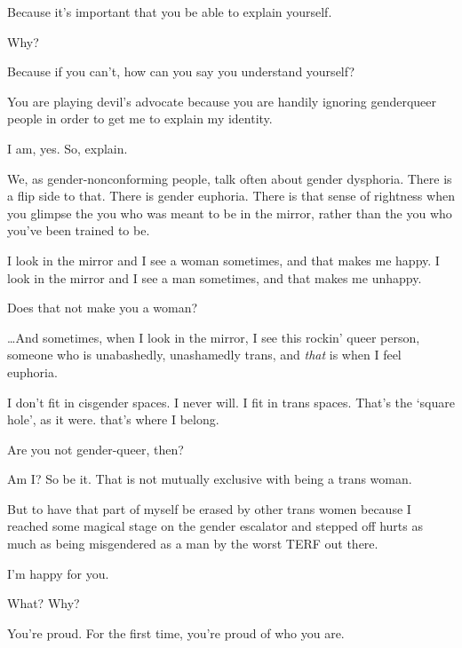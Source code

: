 \begin{ally}
Because it's important that you be able to explain yourself.
\end{ally}
Why?

\begin{ally}
Because if you can't, how can you say you understand yourself?
\end{ally}
\newpage

You are playing devil's advocate because you are handily ignoring genderqueer people in order to get me to explain my identity.

\begin{ally}
I am, yes. So, explain.
\end{ally}
We, as gender-nonconforming people, talk often about gender dysphoria. There is a flip side to that. There is gender euphoria. There is that sense of rightness when you glimpse the you who was meant to be in the mirror, rather than the you who you've been trained to be.

I look in the mirror and I see a woman sometimes, and that makes me happy. I look in the mirror and I see a man sometimes, and that makes me unhappy.

\begin{ally}
Does that not make you a woman?
\end{ally}
\ldots{}And sometimes, when I look in the mirror, I see this rockin' queer person, someone who is unabashedly, unashamedly trans, and \emph{that} is when I feel euphoria.

I don't fit in cisgender spaces. I never will. I fit in trans spaces. That's the `square hole', as it were. that's where I belong.

\begin{ally}
Are you not gender-queer, then?
\end{ally}
Am I? So be it. That is not mutually exclusive with being a trans woman.

But to have that part of myself be erased by other trans women because I reached some magical stage on the gender escalator and stepped off hurts as much as being misgendered as a man by the worst TERF out there.
\newpage

\begin{ally}
I'm happy for you.
\end{ally}
What? Why?

\begin{ally}
You're proud. For the first time, you're proud of who you are.
\end{ally}
\newpage
